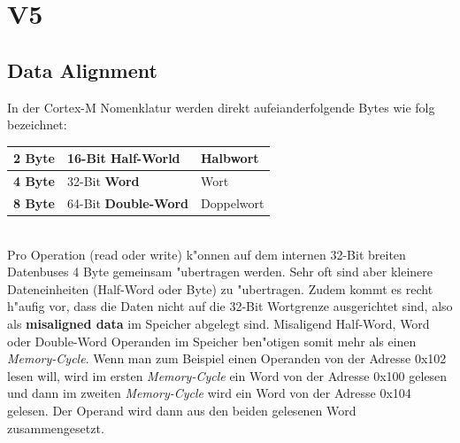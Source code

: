\section{V5}
\subsection{Data Alignment}
In der Cortex-M Nomenklatur werden direkt aufeianderfolgende Bytes wie folg bezeichnet:\\

\begin{tabular}{|l|l|l|}
	\hline
	\textbf{2 Byte} & 16-Bit \textbf{Half-World} & Halbwort \\\hline
	\textbf{4 Byte} & 32-Bit \textbf{Word} & Wort \\\hline
	\textbf{8 Byte} & 64-Bit \textbf{Double-Word} & Doppelwort\\\hline 
\end{tabular}\\

Pro Operation (read oder write) k"onnen auf dem internen 32-Bit breiten Datenbuses 4 Byte gemeinsam "ubertragen werden. Sehr oft sind aber kleinere Dateneinheiten (Half-Word oder Byte) zu "ubertragen. Zudem kommt es recht h"aufig vor, dass die Daten nicht auf die 32-Bit Wortgrenze ausgerichtet sind, also als \textbf{misaligned data} im Speicher abgelegt sind. Misaligend Half-Word, Word oder Double-Word Operanden im Speicher ben"otigen somit mehr als einen \textit{Memory-Cycle}. Wenn man zum Beispiel einen Operanden von der Adresse 0x102 lesen will, wird im ersten \textit{Memory-Cycle} ein Word von der Adresse 0x100 gelesen und dann im zweiten \textit{Memory-Cycle} wird ein Word von der Adresse 0x104 gelesen. Der Operand wird dann aus den beiden gelesenen Word zusammengesetzt.

